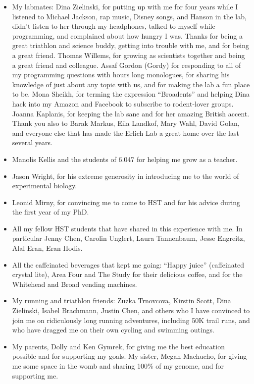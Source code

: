 \begin{itemize}
\item My labmates: Dina Zielinski, for putting up with me for four years while I listened to Michael Jackson, rap music, Disney songs, and Hanson in the lab, didn't listen to her through my headphones, talked to myself while programming, and complained about how hungry I was. Thanks for being a great triathlon and science buddy, getting into trouble with me, and for being a great friend. Thomas Willems, for growing as scientists together and being a great friend and colleague. Assaf Gordon (Gordy) for responding to all of my programming questions with hours long monologues, for sharing his knowledge of just about any topic with us, and for making the lab a fun place to be. Mona Sheikh, for terming the expression ``Broadents'' and helping Dina hack into my Amazon and Facebook to subscribe to rodent-lover groups. Joanna Kaplanis, for keeping the lab sane and for her amazing British accent. Thank you also to Barak Markus, Eila Landkof, Mary Wahl, David Golan, and everyone else that has made the Erlich Lab a great home over the last several years.

\item Manolis Kellis and the students of 6.047 for helping me grow as a teacher.

\item Jason Wright, for his extreme generosity in introducing me to the world of experimental biology.

\item Leonid Mirny, for convincing me to come to HST and for his advice during the first year of my PhD.

\item All my fellow HST students that have shared in this experience with me. In particular Jenny Chen, Carolin Unglert, Laura Tannenbaum, Jesse Engreitz, Alal Eran, Eran Hodis.

\item All the caffeinated beverages that kept me going: ``Happy juice'' (caffeinated crystal lite), Area Four and The Study for their delicious coffee, and for the Whitehead and Broad vending machines. 

\item My running and triathlon friends: Zuzka Trnovcova, Kirstin Scott, Dina Zielinski, Isabel Brachmann, Justin Chen, and others who I have convinced to join me on ridiculously long running adventures, including 50K trail runs, and who have dragged me on their own cycling and swimming outings.

\item My parents, Dolly and Ken Gymrek, for giving me the best education possible and for supporting my goals. My sister, Megan Machucho, for giving me some space in the womb and sharing 100\% of my genome, and for supporting me.

\end{itemize}